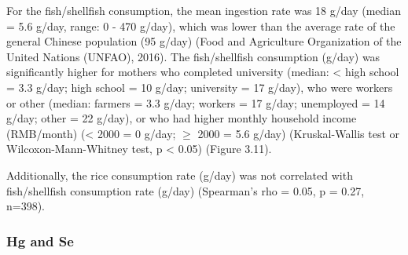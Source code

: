 For the fish/shellfish consumption, the mean ingestion rate was 18 g/day (median = 5.6 g/day, range: 0 - 470 g/day), which was lower than the average rate of the general Chinese population (95 g/day) (Food and Agriculture Organization of the United Nations (UNFAO), 2016). The fish/shellfish consumption (g/day) was significantly higher for mothers who completed university (median: < high school = 3.3 g/day; high school = 10 g/day; university = 17 g/day), who were workers or other (median: farmers = 3.3 g/day; workers = 17 g/day; unemployed = 14 g/day; other = 22 g/day), or who had higher monthly household income (RMB/month) (< 2000 = 0 g/day; ${\ge}$ 2000 = 5.6 g/day) (Kruskal-Wallis test or Wilcoxon-Mann-Whitney test, p < 0.05) (Figure 3.11).

Additionally, the rice consumption rate (g/day) was not correlated with fish/shellfish consumption rate (g/day) (Spearman's rho = 0.05, p = 0.27, n=398).

\subsubsection{Hg and Se}

